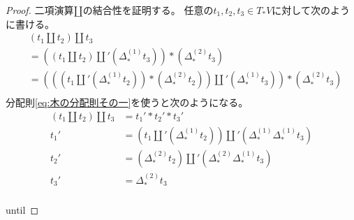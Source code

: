 	\begin{proof} %
		二項演算$\amalg$の結合性を証明する。
		任意の$t_1,t_2,t_3\in T_*V$に対して次のように書ける。
		\begin{equation}\begin{split} %
			&(t_1\amalg t_2)\amalg t_3 \\
			& = \left((t_1\amalg t_2)\amalg'(\Delta_*^{(1)}t_3)\right)*(\Delta_*^{(2)}t_3) \\
			& = \left(\left((t_1\amalg' (\Delta_*^{(1)}t_2))*(\Delta_*^{(2)}t_2)\right)\amalg'(\Delta_*^{(1)}t_3)\right)*(\Delta_*^{(2)}t_3) \\
		\end{split}\end{equation} %
		分配則\eqref{eq:木の分配則その一}を使うと次のようになる。
		\begin{equation}\begin{split} %
			(t_1\amalg t_2)\amalg t_3 &= t_1'*t_2'*t_3' \\
			t_1' &= \left(t_1\amalg'(\Delta_*^{(1)}t_2)\right)\amalg'(\Delta_*^{(1)}\Delta_*^{(1)}t_3) \\
			t_2' &= (\Delta_*^{(2)}t_2)\amalg'(\Delta_*^{(2)}\Delta_*^{(1)}t_3) \\
			t_3' &= \Delta_*^{(2)}t_3 \\
		\end{split}\end{equation} %

until



\end{proof}
